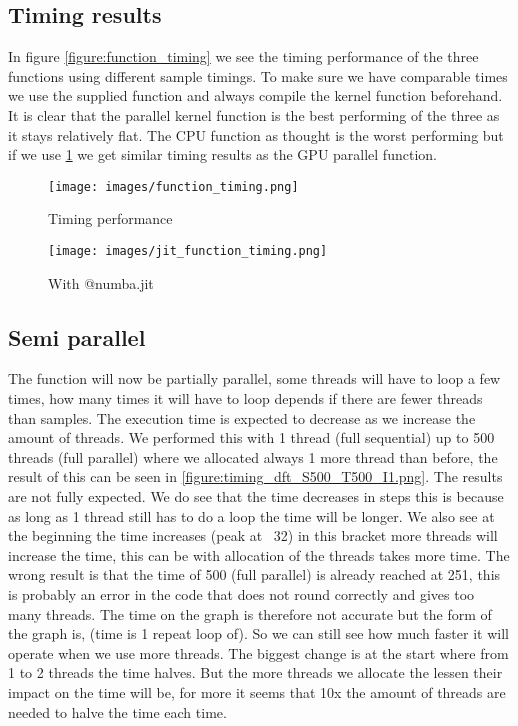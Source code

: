 \newpage

\subsection{Timing results}
\label{subsec:timing results}

In figure \ref{figure:function_timing} we see the timing performance of the three functions using different sample timings. To make sure we have comparable times we use the supplied  function and always compile the kernel function beforehand. It is clear that the parallel kernel function is the best performing of the three as it stays relatively flat.
The CPU function as thought is the worst performing but if we use  \ref{figure:jit_function_timing} we get similar timing results as the GPU parallel function.

\begin{figure}[!htb]
    \centering
    \begin{minipage}[t]{0.45\linewidth}
        \texttt{[image: images/function\_timing.png]}
        \caption{Timing performance}
        \label{figure:function_timing}
    \end{minipage}
    \begin{minipage}[t]{0.45\linewidth}
        \texttt{[image: images/jit\_function\_timing.png]}
        \caption{With @numba.jit}
        \label{figure:jit_function_timing}
    \end{minipage}
\end{figure}

\subsection{Semi parallel}
\label{subsec:semiparallel}
The function will now be partially parallel, some threads will have to loop a few times, how many times it will have to loop depends if there are fewer threads than samples. The execution time is expected to decrease as we increase the amount of threads. We performed this with 1 thread (full sequential) up to 500 threads (full parallel) where we allocated always 1 more thread than before, the result of this can be seen in \ref{figure:timing_dft_S500_T500_I1.png}.
The results are not fully expected. We do see that the time decreases in steps this is because as long as 1 thread still has to do a loop the time will be longer. We also see at the beginning the time increases (peak at ~32) in this bracket more threads will increase the time, this can be with allocation of the threads takes more time. The wrong result is that the time of 500 (full parallel) is already reached at 251, this is probably an error in the code that does not round correctly and gives too many threads. The time on the graph is therefore not accurate but the form of the graph is, (time is 1 repeat loop of).
So we can still see how much faster it will operate when we use more threads. The biggest change is at the start where from 1 to 2 threads the time halves. But the more threads we allocate the lessen their  impact on the time will be, for more it seems that 10x the amount of threads are needed to halve the time each time.


